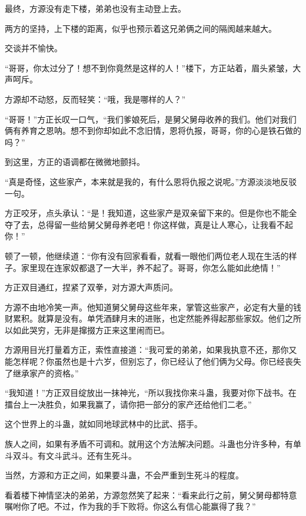 
\begin{this_body}

最终，方源没有走下楼，弟弟也没有主动登上去。

两方的坚持，上下楼的距离，似乎也预示着这兄弟俩之间的隔阂越来越大。

交谈并不愉快。

“哥哥，你太过分了！想不到你竟然是这样的人！”楼下，方正站着，眉头紧皱，大声呵斥。

方源却不动怒，反而轻笑：“哦，我是哪样的人？”

“哥哥！”方正长叹一口气，“我们爹娘死后，是舅父舅母收养的我们。他们对我们俩有养育之恩呐。想不到你却如此不念旧情，恩将仇报，哥哥，你的心是铁石做的吗？”

到这里，方正的语调都在微微地颤抖。

“真是奇怪，这些家产，本来就是我的，有什么恩将仇报之说呢。”方源淡淡地反驳一句。

方正咬牙，点头承认：“是！我知道，这些家产是双亲留下来的。但是你也不能全夺了去，总得留一些给舅父舅母养老吧！你这样做，真是让人寒心，让我看不起你！”

顿了一顿，他继续道：“你有没有回家看看，就看一眼他们两位老人现在生活的样子。家里现在连家奴都退了一大半，养不起了。哥哥，你怎么能如此绝情！”

方正双目通红，捏紧了双拳，对方源大声质问。

方源不由地冷笑一声。他知道舅父舅母这些年来，掌管这些家产，必定有大量的钱财累积。就算是没有。单凭酒肆月末的进账，也定然能养得起那些家奴。他们之所以如此哭穷，无非是撺掇方正来这里闹而已。

方源用目光打量着方正，索性直接道：“我可爱的弟弟，如果我执意不还，那你又能怎样呢？你虽然也是十六岁，但别忘了，你已经认了他们俩为父母。你已经丧失了继承家产的资格。”

“我知道！”方正双目绽放出一抹神光，“所以我找你来斗蛊，我要对你下战书。在擂台上一决胜负，如果我赢了，请你把一部分的家产还给他们二老。”

这个世界上的斗蛊，就如同地球武林中的比武、搭手。

族人之间，如果有矛盾不可调和。就用这个方法解决问题。斗蛊也分许多种，有单斗双斗。有文斗武斗。还有生死斗。

当然，方源和方正之间，如果要斗蛊，不会严重到生死斗的程度。

看着楼下神情坚决的弟弟，方源忽然笑了起来：“看来此行之前，舅父舅母都特意嘱咐你了吧。不过，作为我的手下败将。你这么有信心能赢得了我？”


\end{this_body}

